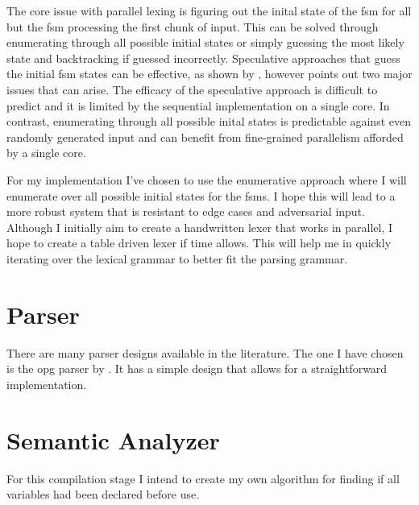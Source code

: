 The core issue with parallel lexing is figuring out the inital state
of the \gls{fsm} for all but the \gls{fsm} processing the first chunk of
input. This can be solved through enumerating through all possible initial
states or simply guessing the most likely state and backtracking if guessed
incorrectly. Speculative approaches that guess the initial \gls{fsm} states
can be effective, as shown by \cite{luchaup_speculative_2011}, however
\cite{mytkowicz_data-parallel_2014} points out two major issues that can
arise. The efficacy of the speculative approach is difficult to predict and
it is limited by the sequential implementation on a single core. In contrast,
enumerating through all possible inital states is predictable against even
randomly generated input and can benefit from fine-grained parallelism afforded
by a single core.

For my implementation I've chosen to use the enumerative approach where I will
enumerate over all possible initial states for the \glspl{fsm}. I hope this will
lead to a more robust system that is resistant to edge cases and adversarial
input. Although I initially aim to create a handwritten lexer that works in
parallel, I hope to create a table driven lexer if time allows. This will help
me in quickly iterating over the lexical grammar to better fit the parsing
grammar.

\section{Parser} \label{parser}

There are many parser designs available in the literature. The one I have chosen
is the \gls{opg} parser by \cite{barenghi_parallel_2015}. It has a simple design
that allows for a straightforward implementation. 

\section{Semantic Analyzer} \label{parser}

For this compilation stage I intend to create my own algorithm for finding if
all variables had been declared before use.
